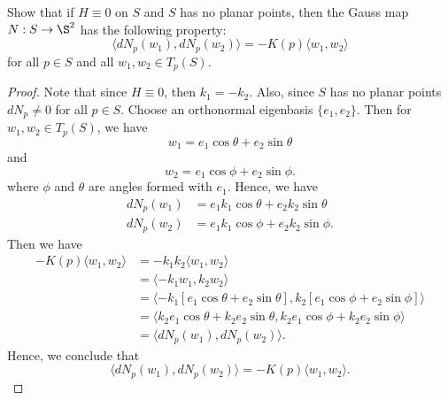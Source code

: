 \documentclass[a4paper]{article}
\begin{document}
\begin{problem}
    Show that if \( H \equiv 0  \) on \( S  \) and \( S  \) has no planar points, then the Gauss map \( N : S \to \S^{2} \) has the following property:
    \[  \langle d {N}_{p} ({w}_{1}) , d {N}_{p} ({w}_{2}) \rangle = - K(p) \langle {w}_{1}  ,  {w}_{2} \rangle \]
    for all \( p \in S  \) and all \( {w}_{1}, {w}_{2} \in {T}_{p}(S) \).
\end{problem}
\begin{proof}
Note that since \( H \equiv  0  \), then \( {k}_{1} = - {k}_{2} \). Also, since \( S  \) has no planar points \( d {N}_{p} \neq 0  \) for all \( p \in S  \). Choose an orthonormal eigenbasis \( \{ {e}_{1}, {e}_{2} \}  \). Then for \( {w}_{1}, {w}_{2} \in {T}_{p}(S) \), we have 
\[  {w}_{1} = {e}_{1} \cos \theta + {e}_{2} \sin \theta \tag{1}  \]
and
\[  {w}_{2} = {e}_{1} \cos \phi + {e}_{2} \sin \phi. \tag{2} \]
where \( \phi  \) and \( \theta  \) are angles formed with \( {e}_{1} \). Hence, we have 
\begin{align*}
    d {N}_{p} ({w}_{1}) &= {e}_{1} {k}_{1} \cos \theta + {e}_{2} {k}_{2} \sin \theta   \\
    d {N}_{p} ({w}_{2}) &= {e}_{1} {k}_{1} \cos \phi + {e}_{2} {k}_{2} \sin \phi.
\end{align*}
Then we have 
\begin{align*}
    - K(p) \langle {w}_{1}  , {w}_{2} \rangle &= - {k}_{1} {k}_{2} \langle {w}_{1} ,  {w}_{2} \rangle  \\
                                              &=  \langle - {k}_{1} {w}_{1}  , {k}_{2} {w }_{2} \rangle \\
                                              &= \langle - {k}_{1} [{e}_{1} \cos \theta + {e}_{2} \sin \theta ]  ,  {k}_{2} [ {e}_{1} \cos \phi + {e}_{2} \sin \phi ] \rangle \\
                                              &= \langle {k}_{2} {e}_{1} \cos \theta + {k}_{2} {e}_{2} \sin \theta ,  {k}_{2} {e}_{1} \cos \phi + {k}_{2} {e}_{2} \sin \phi \rangle \\
                                              &= \langle d {N}_{p}({w}_{1}) , d {N}_{p}({w}_{2}) \rangle.
\end{align*}
Hence, we conclude that 
\[  \langle d {N}_{p}({w}_{1}) ,  d {N}_{p} ({w}_{2}) \rangle = - K(p) \langle {w}_{1}   ,  {w}_{2} \rangle. \]
\end{proof}
\end{document}
